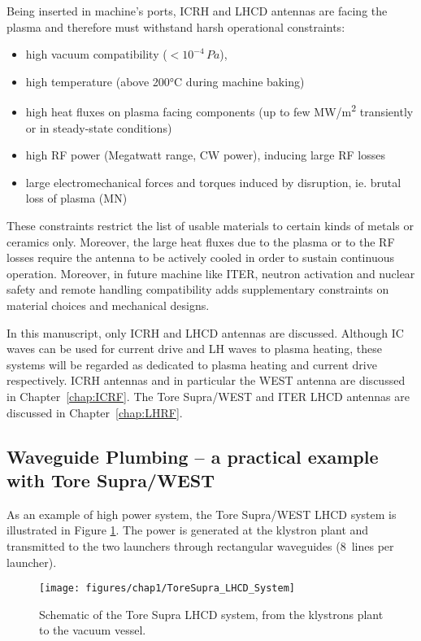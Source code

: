 Being inserted in machine's ports, ICRH and LHCD antennas are facing the plasma and therefore must  withstand harsh operational constraints: 
\begin{itemize}
	\item high vacuum compatibility ($<10^{-4}\,\si{Pa}$), 
	\item high temperature (above 200°C during machine baking)
	\item high heat fluxes on plasma facing components (up to few \si{MW/m^2} transiently or in steady-state conditions)
	\item high RF power (Megatwatt range, CW power), inducing large RF losses
	\item large electromechanical forces and torques induced by disruption, ie. brutal loss of plasma (\si{MN})
\end{itemize}
These constraints restrict the list of usable materials to certain kinds of metals or ceramics only. Moreover, the large heat fluxes due to the plasma or to the RF losses require the antenna to be actively cooled in order to sustain continuous operation. Moreover, in future machine like ITER, neutron activation and nuclear safety and remote handling compatibility adds supplementary constraints on material choices and mechanical designs.

In this manuscript, only ICRH and LHCD antennas are discussed. Although IC waves can be used for current drive and LH waves to plasma heating, these systems will be regarded as dedicated to plasma heating and current drive respectively. ICRH antennas and in particular the WEST antenna are discussed in Chapter~\ref{chap:ICRF}. The Tore Supra/WEST and ITER LHCD antennas are discussed in Chapter~\ref{chap:LHRF}.


\subsection{Waveguide Plumbing – a practical example with Tore Supra/WEST}
As an example of high power system, the Tore Supra/WEST LHCD system is illustrated in Figure \ref{fig:toresupralhcdsystem}. The power is generated at the klystron plant and transmitted to the two launchers through rectangular waveguides (8~lines per launcher). 

\begin{figure}
	\centering
	\texttt{[image: figures/chap1/ToreSupra\_LHCD\_System]}
	\caption{Schematic of the Tore Supra LHCD system, from the klystrons plant to the vacuum vessel.}
	\label{fig:toresupralhcdsystem}
\end{figure}

